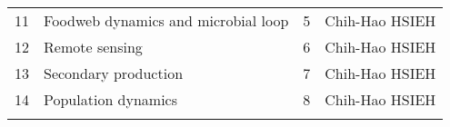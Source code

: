 \documentclass[
]{article}
\begin{document}
\begin{longtable}[]{@{}llll@{}}
\begin{minipage}[t]{0.13\columnwidth}
11\strut
\end{minipage} & \begin{minipage}[t]{0.23\columnwidth}\raggedright
Foodweb dynamics and microbial loop\strut
\end{minipage} & \begin{minipage}[t]{0.23\columnwidth}\raggedright
5\strut
\end{minipage} & \begin{minipage}[t]{0.30\columnwidth}\raggedright
Chih-Hao HSIEH\strut
\end{minipage}\tabularnewline
\begin{minipage}[t]{0.13\columnwidth}\raggedright
12\strut
\end{minipage} & \begin{minipage}[t]{0.23\columnwidth}\raggedright
Remote sensing\strut
\end{minipage} & \begin{minipage}[t]{0.23\columnwidth}\raggedright
6\strut
\end{minipage} & \begin{minipage}[t]{0.30\columnwidth}\raggedright
Chih-Hao HSIEH\strut
\end{minipage}\tabularnewline
\begin{minipage}[t]{0.13\columnwidth}\raggedright
13\strut
\end{minipage} & \begin{minipage}[t]{0.23\columnwidth}\raggedright
Secondary production\strut
\end{minipage} & \begin{minipage}[t]{0.23\columnwidth}\raggedright
7\strut
\end{minipage} & \begin{minipage}[t]{0.30\columnwidth}\raggedright
Chih-Hao HSIEH\strut
\end{minipage}\tabularnewline
\begin{minipage}[t]{0.13\columnwidth}\raggedright
14\strut
\end{minipage} & \begin{minipage}[t]{0.23\columnwidth}\raggedright
Population dynamics\strut
\end{minipage} & \begin{minipage}[t]{0.23\columnwidth}\raggedright
8\strut
\end{minipage} & \begin{minipage}[t]{0.30\columnwidth}\raggedright
Chih-Hao HSIEH\strut
\end{minipage}\tabularnewline
\begin{minipage}[t]{0.13\columnwidth}\raggedright

\end{minipage}
\end{longtable}
\end{document}
